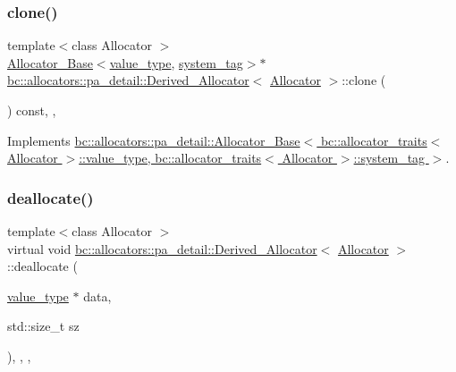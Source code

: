 \subsubsection{\texorpdfstring{clone()}{clone()}}
{\footnotesize\ttfamily template$<$class Allocator $>$ \\
\hyperlink{structbc_1_1allocators_1_1pa__detail_1_1Allocator__Base}{Allocator\+\_\+\+Base}$<$\hyperlink{structbc_1_1allocators_1_1pa__detail_1_1Derived__Allocator_a997c60e64ca7028da4c9eb15b5bf553d}{value\+\_\+type}, \hyperlink{structbc_1_1allocators_1_1pa__detail_1_1Derived__Allocator_a42f99505929fa39c067d186f5f623045}{system\+\_\+tag}$>$$\ast$ \hyperlink{structbc_1_1allocators_1_1pa__detail_1_1Derived__Allocator}{bc\+::allocators\+::pa\+\_\+detail\+::\+Derived\+\_\+\+Allocator}$<$ \hyperlink{classbc_1_1allocators_1_1Allocator}{Allocator} $>$\+::clone (\begin{DoxyParamCaption}{ }\end{DoxyParamCaption}) const\hspace{0.3cm}{\ttfamily [inline]}, {\ttfamily [override]}, {\ttfamily [virtual]}}



Implements \hyperlink{structbc_1_1allocators_1_1pa__detail_1_1Allocator__Base_abb9ba3168afaead6638e81f618f74b48}{bc\+::allocators\+::pa\+\_\+detail\+::\+Allocator\+\_\+\+Base$<$ bc\+::allocator\+\_\+traits$<$ Allocator $>$\+::value\+\_\+type, bc\+::allocator\+\_\+traits$<$ Allocator $>$\+::system\+\_\+tag $>$}.

\mbox{\label{structbc_1_1allocators_1_1pa__detail_1_1Derived__Allocator_a14b837c6cc64fe049f9c18d219e13cf5}} 
\subsubsection{\texorpdfstring{deallocate()}{deallocate()}}
{\footnotesize\ttfamily template$<$class Allocator $>$ \\
virtual void \hyperlink{structbc_1_1allocators_1_1pa__detail_1_1Derived__Allocator}{bc\+::allocators\+::pa\+\_\+detail\+::\+Derived\+\_\+\+Allocator}$<$ \hyperlink{classbc_1_1allocators_1_1Allocator}{Allocator} $>$\+::deallocate (\begin{DoxyParamCaption}\item[{\hyperlink{structbc_1_1allocators_1_1pa__detail_1_1Derived__Allocator_a997c60e64ca7028da4c9eb15b5bf553d}{value\+\_\+type} $\ast$}]{data,  }\item[{std\+::size\+\_\+t}]{sz }\end{DoxyParamCaption})\hspace{0.3cm}{\ttfamily [inline]}, {\ttfamily [final]}, {\ttfamily [override]}, {\ttfamily [virtual]}}



